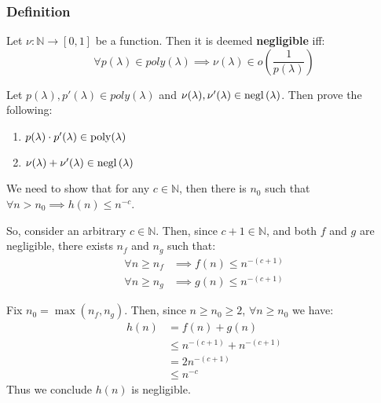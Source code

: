 \subsubsection{Definition}
Let $\nu : \mathbb{N} \to [0,1]$ be a function. Then it is deemed \textbf{negligible} iff:
\begin{equation*}
    \forall p(\lambda) \in poly(\lambda) \implies \nu(\lambda) \in o(\frac{1}{p(\lambda)})
\end{equation*}

\begin{exercise}
    Let $p(\lambda), p'(\lambda) \in poly(\lambda)$ and $\nu(\lambda), \nu'(\lambda) \in \mathrm{negl}\left({\lambda}\right)$. Then prove the following:

    \begin{enumerate}
        \item $p(\lambda) \cdot p'( \lambda) \in  \mathrm{poly}(\lambda)$
        \item $\nu(\lambda) + \nu'(\lambda) \in \mathrm{negl}\left({\lambda}\right)$
    \end{enumerate} 
\end{exercise}

\begin{solution}[1.1]


    We need to show that for any $c \in \mathbb{N} $, then there is $n_{0}$ such that $\forall n > n_{0} \implies h(n) \leq n^{-c}$.
    
    So, consider an arbitrary $c \in \mathbb{N}$. Then, since $c+1 \in \mathbb{N} $, and both $f$ and $g$ are negligible, there exists $n_{f}$ and $n_{g}$ such that:
    \begin{align*}
        \forall n \geq n_{f} &\implies f(n) \leq n^{-(c+1)} \\
        \forall n \geq n_{g} &\implies g(n) \leq n^{-(c+1)}
    \end{align*}

    Fix $n_{0} = \max(n_{f}, n_{g})$. Then, since $n \geq n_{0} \geq 2$, $\forall n \geq n_{0}$ we have:
    \begin{align*}
        h(n) &= f(n)+g(n) \\
        &\leq n^{-(c+1)} + n^{-(c+1)} \\
        &= 2n^{-(c+1)} \\
        &\leq n^{-c}
    \end{align*}
    Thus we conclude $h(n)$ is negligible.
\end{solution}


